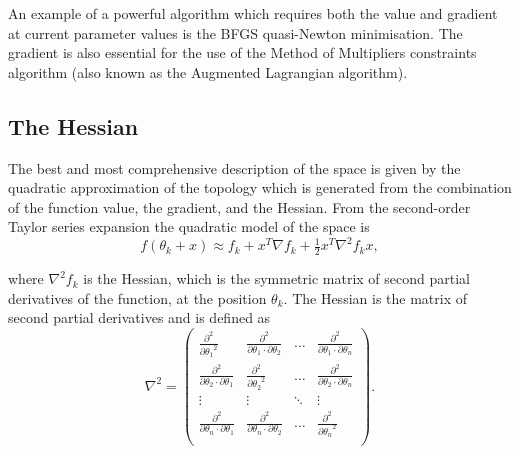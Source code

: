 An example of a powerful algorithm which requires both the value and gradient at current parameter values is the BFGS quasi-Newton minimisation.
The gradient is also essential for the use of the Method of Multipliers constraints algorithm (also known as the Augmented Lagrangian algorithm).




\subsection{The Hessian}
\label{sect: Hessian}

The best and most comprehensive description of the space is given by the quadratic approximation of the topology which is generated from the combination of the function value, the gradient, and the Hessian.
From the second-order Taylor series expansion the quadratic model of the space is
\begin{equation} \label{eq: quadratic model}
 f(\theta_k + x) \approx f_k  +  x^T \nabla f_k  +  \tfrac{1}{2} x^T \nabla^2 f_k x,
\end{equation}

\noindent where $\nabla^2 f_k$ is the Hessian, which is the symmetric matrix of second partial derivatives of the function, at the position $\theta_k$.
The Hessian is the matrix of second partial derivatives and is defined as
\begin{equation}
 \nabla^2 = \begin{pmatrix}
  \frac{\partial^2}{{\partial \theta_1}^2}                       & \frac{\partial^2}{\partial \theta_1 \cdot \partial \theta_2}  & \ldots    & \frac{\partial^2}{\partial \theta_1 \cdot \partial \theta_n} \\
  \frac{\partial^2}{\partial \theta_2 \cdot \partial \theta_1} & \frac{\partial^2}{{\partial \theta_2}^2}                        & \ldots    & \frac{\partial^2}{\partial \theta_2 \cdot \partial \theta_n} \\
  \vdots                                                       & \vdots                                                        & \ddots    & \vdots \\
  \frac{\partial^2}{\partial \theta_n \cdot \partial \theta_1} & \frac{\partial^2}{\partial \theta_n \cdot \partial \theta_2}  & \ldots    & \frac{\partial^2}{{\partial \theta_n}^2} \\
 \end{pmatrix}.
\end{equation}

